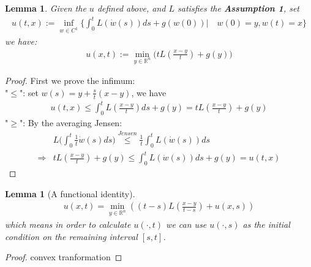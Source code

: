 \documentclass[a4paper,11pt,oneside,fleqn]{book}
\newtheorem{lemma}[theorem]{Lemma}
\theoremstyle{definition}
\theoremstyle{remark}
\begin{document}
\begin{lemma}
	Given the $u$ defined above, and $L$ satisfies the \textbf{Assumption 1}, set
\begin{align*}
	u(t, x) := \inf_{w \in C^1} \bigg\{ \int_0^t L(\dot{w}(s) ) ds + g(w(0)) \bigg| \quad w(0) = y, w(t) = x\bigg\}
\end{align*}
we have:
\begin{align*}
		u(x, t):= \min_{y \in \mathbb{R}^n} \bigg(t L(\frac{x - y}{t}) + g(y)\bigg)
\end{align*}
\end{lemma}
\begin{proof}
First we prove the infimum:\\
"$\leq$": set $w(s) = y + \frac{s}{t}(x - y)$, we have
\begin{align*}
	u(t, x) \le \int_0^t L(\frac{x - y}{t})ds + g(y) = t L(\frac{x - y}{t}) + g(y)
\end{align*}
"$\geq$": By the averaging Jensen:
\begin{align*}
	 &L\bigg(\int_0^t \frac{1}{t} \dot{w}(s) ds \bigg) \overset{Jensen}{\le} \frac{1}{t} \int_0^t L(\dot{w}(s))ds  \\
	 \Rightarrow
	 & t L(\frac{x - y}{t}) + g(y) \le \int_0^t L(\dot{w}(s))ds + g(y) = u(t, x)
\end{align*}
\end{proof}

\begin{lemma}[A functional identity]
	\begin{align*}
		u(x, t) = \min_{y \in \mathbb{R}^n} ((t-s)L(\frac{x - y}{t - s}) + u(x, s)) 
	\end{align*}
	which means in order to calculate $u( \cdot, t)$ we can use $u( \cdot, s)$ as the initial condition on the remaining interval $[s, t]$. 
\end{lemma}
\begin{proof}
	convex tranformation
\end{proof}
	
\end{document}
